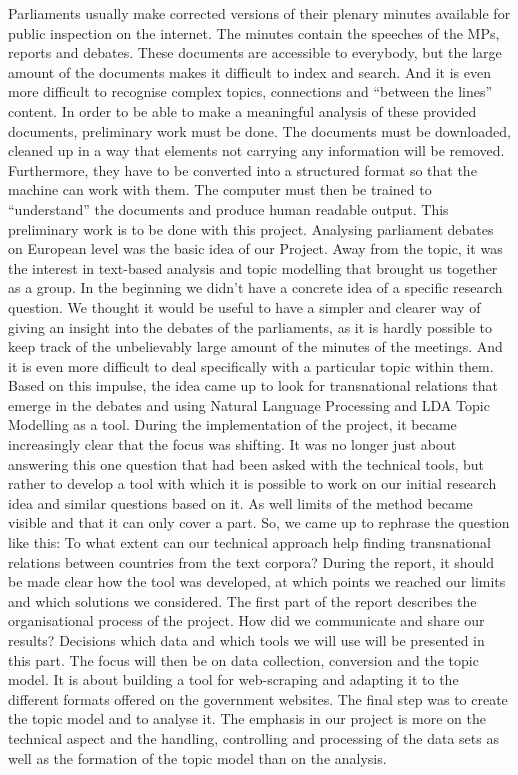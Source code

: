 \documentclass[
  12pt,
]{scrreprt}
\begin{document}
Parliaments usually make corrected versions of their plenary minutes
available for public inspection on the internet. The minutes contain the
speeches of the MPs, reports and debates. These documents are accessible
to everybody, but the large amount of the documents makes it difficult
to index and search. And it is even more difficult to recognise complex
topics, connections and ``between the lines'' content. In order to be
able to make a meaningful analysis of these provided documents,
preliminary work must be done. The documents must be downloaded, cleaned
up in a way that elements not carrying any information will be removed.
Furthermore, they have to be converted into a structured format so that
the machine can work with them. The computer must then be trained to
``understand'' the documents and produce human readable output. This
preliminary work is to be done with this project. Analysing parliament
debates on European level was the basic idea of our Project. Away from
the topic, it was the interest in text-based analysis and topic
modelling that brought us together as a group. In the beginning we
didn't have a concrete idea of a specific research question. We thought
it would be useful to have a simpler and clearer way of giving an
insight into the debates of the parliaments, as it is hardly possible to
keep track of the unbelievably large amount of the minutes of the
meetings. And it is even more difficult to deal specifically with a
particular topic within them. Based on this impulse, the idea came up to
look for transnational relations that emerge in the debates and using
Natural Language Processing and LDA Topic Modelling as a tool. During
the implementation of the project, it became increasingly clear that the
focus was shifting. It was no longer just about answering this one
question that had been asked with the technical tools, but rather to
develop a tool with which it is possible to work on our initial research
idea and similar questions based on it. As well limits of the method
became visible and that it can only cover a part. So, we came up to
rephrase the question like this: To what extent can our technical
approach help finding transnational relations between countries from the
text corpora? During the report, it should be made clear how the tool
was developed, at which points we reached our limits and which solutions
we considered. The first part of the report describes the organisational
process of the project. How did we communicate and share our results?
Decisions which data and which tools we will use will be presented in
this part. The focus will then be on data collection, conversion and the
topic model. It is about building a tool for web-scraping and adapting
it to the different formats offered on the government websites. The
final step was to create the topic model and to analyse it. The emphasis
in our project is more on the technical aspect and the handling,
controlling and processing of the data sets as well as the formation of
the topic model than on the analysis.
\end{document}
